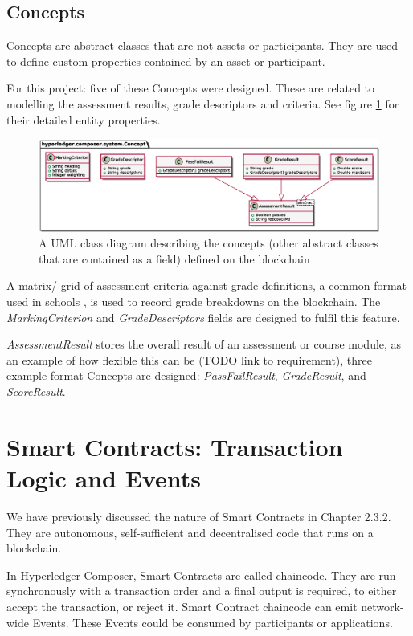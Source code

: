 \subsection{Concepts}

Concepts are abstract classes that are not assets or participants. They are used to define custom properties contained by an asset or participant.

For this project: five of these Concepts were designed. These are related to modelling the assessment results, grade descriptors and criteria. 
See figure \ref{fig:concepts} for their detailed entity properties.

\begin{figure}[!ht] 
    \centering    
    \includegraphics[width=1.0\textwidth]{concepts}
    \caption[Concepts Class Diagram]
        {A UML class diagram describing the concepts (other abstract classes that are contained as a field) defined on the blockchain} 
    \label{fig:concepts}
\end{figure}

A matrix/ grid of assessment criteria against grade definitions, a common format used in schools \citep[p.102]{bryan2006innovative}, 
is used to record grade breakdowns on the blockchain. The \textit{MarkingCriterion} and \textit{GradeDescriptors} fields are designed to 
fulfil this feature.

\textit{AssessmentResult} stores the overall result of an assessment or course module, as an example of how flexible this can be (TODO link to requirement), 
three example format Concepts are designed: \textit{PassFailResult}, \textit{GradeResult}, and \textit{ScoreResult}.

\section{Smart Contracts: Transaction Logic and Events}

We have previously discussed the nature of Smart Contracts in Chapter 2.3.2. They are autonomous, self-sufficient and 
decentralised code that runs on a blockchain. 

In Hyperledger Composer, Smart Contracts are called chaincode. 
They are run synchronously with a transaction order and a final output is required, to either accept the transaction, or reject it. 
Smart Contract chaincode can emit network-wide Events. These Events could be consumed by participants or applications.

